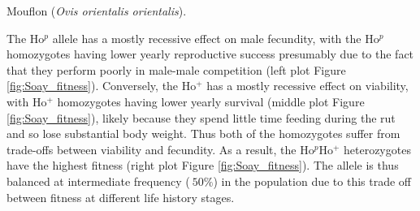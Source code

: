 \begin{marginfigure}
\begin{center}
\end{center}
\caption{Mouflon ({\it Ovis orientalis orientalis}).  } \label{fig:Mouflon}
\end{marginfigure} The Ho$^p$ allele has a mostly recessive effect on
male fecundity, with the Ho$^p$ homozygotes having lower yearly reproductive
success presumably due to the fact that they perform poorly in male-male
competition (left plot Figure \ref{fig:Soay_fitness}). Conversely, the
Ho$^{+}$ has a mostly recessive effect on viability, with Ho$^{+}$ homozygotes having lower
yearly survival  (middle plot Figure \ref{fig:Soay_fitness}), likely because they spend little time feeding during the rut and so lose substantial body weight. Thus both of the
homozygotes suffer from trade-offs between viability and
fecundity. As a result, the Ho$^p$Ho$^+$ heterozygotes have the highest
fitness  (right plot Figure \ref{fig:Soay_fitness}).  The allele is
thus balanced at intermediate frequency ($~50\%$) in the population due to 
this trade off between fitness at different life history stages.

